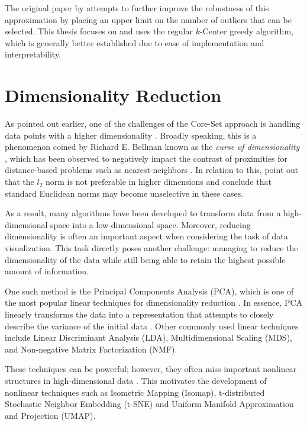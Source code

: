 \documentclass[english,bachelor,ul]{webisthesis} %
\begin{document}
\vspace{0.3\baselineskip}

The original paper by \cite{DBLP:conf/iclr/SenerS18} attempts to further improve the robustness of this approximation by placing an upper limit on the number of outliers that can be selected. This thesis focuses on and uses the regular $k$-Center greedy algorithm, which is generally better established due to ease of implementation and interpretability.

\section{Dimensionality Reduction}

As pointed out earlier, one of the challenges of the Core-Set approach is handling data points with a higher dimensionality \citep{DBLP:conf/iccv/SinhaED19}. Broadly speaking, this is a phenomenon coined by Richard E. Bellman known as the \textit{curse of dimensionality} \citep{Freimer1961AdaptiveCP}, which has been observed to negatively impact the contrast of proximities for distance-based problems such as nearest-neighbors \citep{DBLP:conf/icdt/BeyerGRS99, DBLP:books/lib/HastieTF09}. In relation to this, \cite{DBLP:conf/icdt/AggarwalHK01} point out that the $ l_2 $ norm is not preferable in higher dimensions and \cite{DBLP:conf/iwann/VerleysenF05} conclude that standard Euclidean norms may become unselective in these cases.

As a result, many algorithms have been developed to transform data from a high-dimensional space into a low-dimensional space. Moreover, reducing dimensionality is often an important aspect when considering the task of data visualization. This task directly poses another challenge: managing to reduce the dimensionality of the data while still being able to retain the highest possible amount of information. 

One such method is the Principal Components Analysis (PCA), which is one of the most popular linear techniques for dimensionality reduction \citep{van2009dimensionality}. In essence, PCA linearly transforms the data into a representation that attempts to closely describe the variance of the initial data \citep{jolliffe2016principal}. Other commonly used linear techniques include Linear Discriminant Analysis (LDA), Multidimensional Scaling (MDS), and Non-negative Matrix Factorization (NMF).

These techniques can be powerful; however, they often miss important nonlinear structures in high-dimensional data \citep{Tenenbaum2000AGG}. This motivates the development of nonlinear techniques such as Isometric Mapping (Isomap), t-distributed Stochastic Neighbor Embedding (t-SNE) and Uniform Manifold Approximation and Projection (UMAP). 
\end{document}
